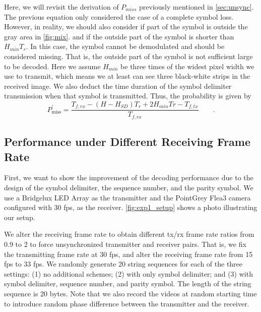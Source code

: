 Here, we will revisit the derivation of $P_{miss}$ previously mentioned in \autoref{sec:unsync}. The previous equation only considered the case of a complete symbol loss. However, in reality, we should also consider if part of the symbol is outside the gray area in \autoref{fig:mix}. and if the outside part of the symbol is shorter than $H_{min} T_r$. In this case, the symbol cannot be demodulated and should be considered missing. That is, the outside part of the symbol is not sufficient large to be decoded. Here we assume $H_{min}$ be three times of the widest pixel width we use to transmit, which means we at least can see three black-white strips in the received image. We also deduct the time duration of the symbol delimiter transmission when that symbol is transmitted. Thus, the probability is given by
\begin{equation}
	P_{\operatorname{miss}}^ \prime=\frac{T_{f,rx} - (H - H_{SD}) T_r +  2H_{min} Tr- T_{f,tx} }{T_{f,rx}} \qquad \textrm{.}
\end{equation}

\subsection{Performance under Different Receiving Frame Rate}
First, we want to show the improvement of the decoding performance due to the design of the symbol delimiter, the sequence number, and the parity symbol. We use a Bridgelux LED Array as the transmitter and the PointGrey Flea3 camera configured with 30 fps, as the receiver. \autoref{fig:exp1_setup} shows a photo illustrating our setup. 

We alter the receiving frame rate to obtain different tx/rx frame rate ratios from 0.9 to 2 to force unsynchronized transmitter and receiver pairs. That is, we fix the transmitting frame rate at 30 fps, and alter the receiving frame rate from 15 fps to 33 fps. We randomly generate 20 string sequences for each of the three settings: (1) no additional schemes; (2) with only symbol delimiter; and (3) with symbol delimiter, sequence number,  and parity symbol. 
The length of the string sequence is 20 bytes. Note that we also record the videos at random starting time to introduce random phase difference between the transmitter and the receiver.

